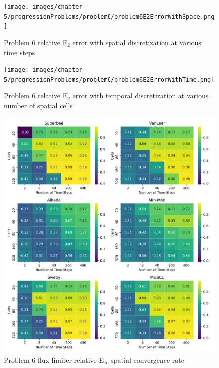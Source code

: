 \begin{figure}[p]
    \centering
    \texttt{[image: images/chapter-5/progressionProblems/problem6/problem6E2ErrorWithSpace.png]}
    \caption{Problem 6 relative E${}_{2}$ error with spatial discretization at various time steps }
    \label{fig:problem6_l2error_spatial_results}
\end{figure}

\clearpage

\begin{figure}[p]
    \centering
    \texttt{[image: images/chapter-5/progressionProblems/problem6/problem6E2ErrorWithTime.png]}
    \caption{Problem 6 relative E${}_{2}$ error with temporal discretization at various number of spatial cells}
    \label{fig:problem6_l2error_time_results}
\end{figure}

\clearpage

\begin{figure}[p]
    \centering
    \includegraphics[width=6in]{images/chapter-5/progressionProblems/problem6/problem6EinftyFluxLimiterConvergenceRate.png}
    \caption{Problem 6 flux limiter relative E${}_{\infty}$ spatial convergence rate}
    \label{fig:problem6_linferror_fluxlimiter_convergence_rate}
\end{figure}

